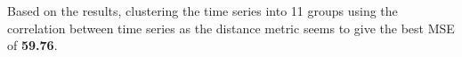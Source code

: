 \documentclass[nonblindrev,msom]{informs3} %
\begin{document}

\noindent Based on the results, clustering the time series into 11 groups using the correlation between time series as the distance metric seems to give the best MSE of \textbf{59.76}. 

%
%
%
\end{document}
